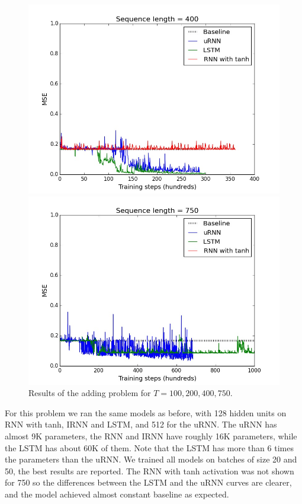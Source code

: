 \documentclass{article} %
\begin{document}
\begin{figure}[ht]
\begin{minipage}[b]{0.5\linewidth}
    \includegraphics[scale=0.25]{figures/adding_400.jpeg}
    \vspace{4ex}
    \end{minipage}%
  \begin{minipage}[b]{0.5\linewidth}
    \centering
    \includegraphics[scale=0.25]{figures/adding_750.jpeg}
    \vspace{4ex}
  \end{minipage} 
  \caption{Results of the adding problem for $T=100, 200, 400, 750$.}
\end{figure}

For this problem we ran the same models as before, with 128 hidden units on RNN with tanh, IRNN and LSTM, and 512 for the uRNN. The uRNN has almost 9K parameters, the RNN and IRNN have roughly 16K parameters, while the LSTM has about 60K of them. Note that the LSTM has more than 6 times the parameters than the uRNN. We trained all models on batches of size 20 and 50, the best results are reported. The RNN with tanh activation was not shown for 750 so the differences between the LSTM and the uRNN curves are clearer, and the model achieved almost constant baseline as expected. 
\end{document}
